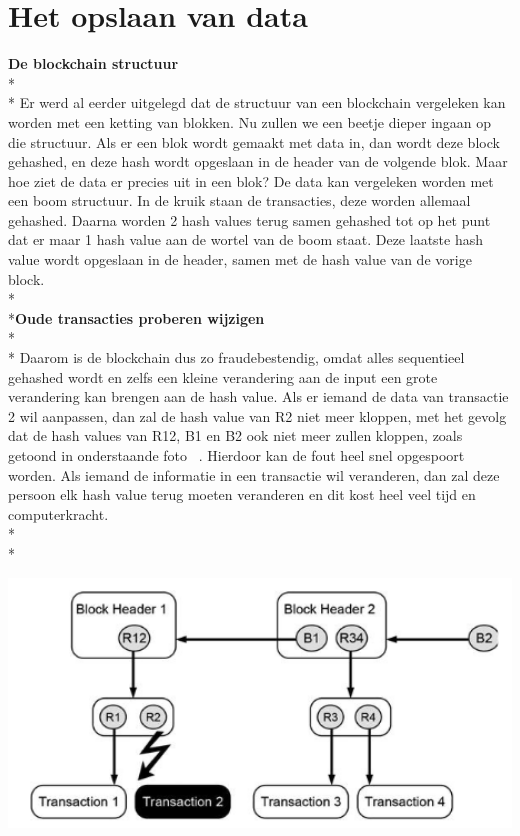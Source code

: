 \documentclass[fleqn,a4paper,12pt]{book}
\begin{document}
\section{Het opslaan van data}
\textbf{De blockchain structuur}\\*\\*
Er werd al eerder uitgelegd dat de structuur van een blockchain vergeleken kan worden met een ketting van blokken. Nu zullen we een beetje dieper ingaan op die structuur. Als er een blok wordt gemaakt met data in, dan wordt deze block gehashed, en deze hash wordt opgeslaan in de header van de volgende blok. Maar hoe ziet de data er precies uit in een blok? De data kan vergeleken worden met een boom structuur. In de kruik staan de transacties, deze worden allemaal gehashed. Daarna worden 2 hash values terug samen gehashed tot op het punt dat er maar 1 hash value aan de wortel van de boom staat. Deze laatste hash value wordt opgeslaan in de header, samen met de hash value van de vorige block.
\\*\\*\textbf{Oude transacties proberen wijzigen}\\*\\*
Daarom is de blockchain dus zo fraudebestendig, omdat alles sequentieel gehashed wordt en zelfs een kleine verandering aan de input een grote verandering kan brengen aan de hash value. Als er iemand de data van transactie 2 wil aanpassen, dan zal de hash value van R2 niet meer kloppen, met het gevolg dat de hash values van R12, B1 en B2 ook niet meer zullen kloppen, zoals getoond in onderstaande foto ~\autocite{blockchain1}. Hierdoor kan de fout heel snel opgespoort worden. Als iemand de informatie in een transactie wil veranderen, dan zal deze persoon elk hash value terug moeten veranderen en dit kost heel veel tijd en computerkracht.\\*\\*
\begin{center}
	\includegraphics[width=14cm]{img/change}\\[1cm]
\end{center}
\end{document}
